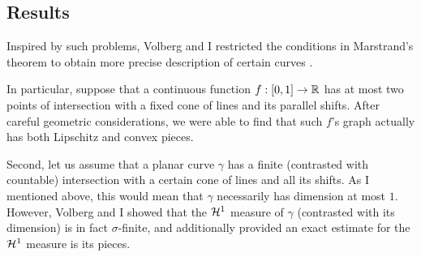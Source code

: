 \documentclass[11pt]{amsart} %
\theoremstyle{remark} %
\theoremstyle{definition} %
\numberwithin{equation}{section} %
\newcommand{\0}[1]{\overline{#1}} %
\newcommand{\1}[1]{\tilde{#1}} %
\newcommand{\2}[1]{{}_{|#1}} %
\begin{document}
\subsection*{Results}	%
Inspired by such problems, Volberg and I restricted the conditions in Marstrand's theorem to obtain more precise description of certain curves \cite{VarVol2019ep_2021}.

In particular, suppose that a continuous function $f:[0,1]\to{\mathbb{R}}$ has at most two points of intersection with a fixed cone of lines and its parallel shifts. After careful geometric considerations, we were able to find that such $f$'s graph actually has both Lipschitz and convex pieces.

Second, let us assume that a planar curve $γ$ has a finite (contrasted with countable) intersection with a certain cone of lines and all its shifts. As I mentioned above, this would mean that $γ$ necessarily has dimension at most $1$. However, Volberg and I showed that the ${\mathcal{H}}^1$ measure of $γ$ (contrasted with its dimension) is in fact $σ$-finite, and additionally provided an exact estimate for the ${\mathcal{H}}^1$ measure is its pieces.

%
%
%
%
%
%

\printbibliography
\end{document}
